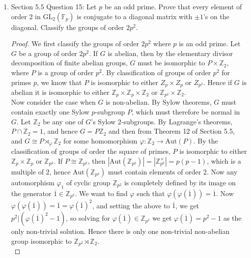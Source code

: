 \documentclass{article}
\begin{document}
\begin{enumerate}[label={\bf Q\arabic*:}]
\begin{proof}
      Summarizing, there is exactly one non-abelian group of order 75 and
      two abelian groups of order 75, up to isomorphism. 
    \end{proof}

  \item Section 5.5 Question 15: Let $p$ be an odd prime. Prove that every
    element of order 2 in $\text{GL}_2(\mathbb{F}_p)$ is conjugate to a
    diagonal matrix with $\pm1$'s on the diagonal. Classify the groups of
    order $2p^2$.

    \begin{proof}
      We first classify the groups of order $2p^2$ where $p$ is an odd
      prime. Let $G$ be a group of order $2p^2$. If $G$ is abelian, then
      by the elementary divisor decomposition of finite abelian groups, $G$
      must be isomorphic to $P\times\mathbb{Z}_2$, where $P$ is a group
      of order $p^2$. By classification of groups of order $p^2$ for primes
      $p$, we know that $P$ is isomorphic to either $Z_p\times Z_p$ or
      $Z_{p^2}$. Hence if $G$ is abelian it is isomorphic to either
      $\mathbb{Z}_p\times\mathbb{Z}_p\times\mathbb{Z}_2$ or
      $\mathbb{Z}_{p^2}\times\mathbb{Z}_2$. \\

      Now consider the case when $G$ is non-abelian. By Sylow theorems, $G$
      must contain exactly one Sylow $p$-subgroup $P$, which must therefore
      be normal in $G$. Let $\mathbb{Z}_2$ be any one of $G$'s Sylow
      2-subgroups. By Lagrange's theorems, $P\cap \mathbb{Z}_2=1$, and
      hence $G=P\mathbb{Z}_2$ and then from Theorem 12 of Section 5.5, and
      $G\cong P\rtimes_{\varphi}\mathbb{Z}_2$ for some homomorphism
      $\varphi:\mathbb{Z}_2\rightarrow\text{Aut}(P)$. By the classification
      of groups of order the square of primes, $P$ is isomorphic to either
      $\mathbb{Z}_p\times\mathbb{Z}_p$ or $\mathbb{Z}_{p^2}$. If
      $P\cong\mathbb{Z}_{p^2}$, then
      $|\text{Aut}(\mathbb{Z}_{p^2})|=|\mathbb{Z}_{p^2}^\times|=p(p-1)$,
      which is a multiple of 2, hence $\text{Aut}(\mathbb{Z}_{p^2})$ must
      contain elements of order 2. Now any automorphism $\varphi_1$ of cyclic
      group $\mathbb{Z}_{p^2}$ is completely defined by its image on the
      generator $\overline{1}\in\mathbb{Z}_{p^2}$. We want to find
      $\varphi$ such that $\varphi(\varphi(\overline{1}))=\overline{1}$.
      Now
      $\varphi(\varphi(\overline{1}))=\overline{1}=\varphi(\overline{1})^2$,
      and setting the above to $\overline{1}$, we get
      $p^2|(\varphi(\overline{1})^2-1)$, so solving for
      $\varphi(\overline{1})\in\mathbb{Z}_{p^2}$ we get
      $\varphi(\overline{1})=p^2-1$ as the only non-trivial solution.
      Hence there is only one non-trivial non-abelian group isomorphic to
      $\mathbb{Z}_{p^2}\rtimes\mathbb{Z}_2$. \\


\end{proof}
\end{enumerate}
\end{document}
